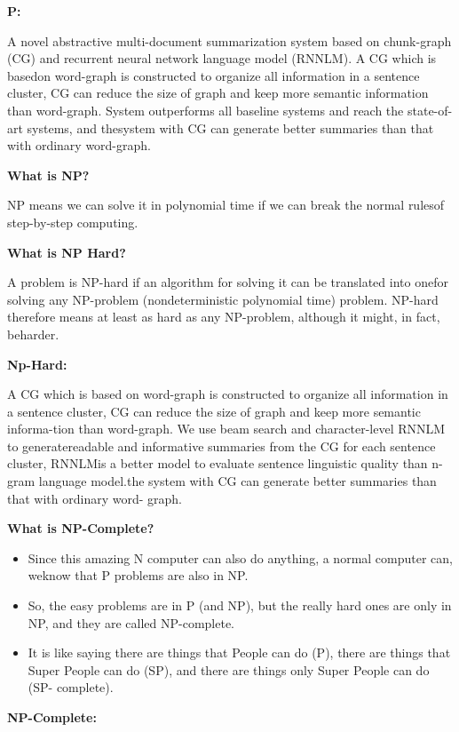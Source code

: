 \documentclass[12pt]{report}
\begin{document}
\textbf{P:}

A novel abstractive multi-document summarization system based on chunk-graph (CG) and
recurrent neural network language model (RNNLM). A CG which is basedon word-graph is 
constructed to organize all information in a sentence cluster, CG can reduce the size of graph 
and keep more semantic information than word-graph. System outperforms all baseline systems 
and reach the state-of-art systems, and thesystem with CG can generate better summaries than
that with ordinary word-graph.



\vspace{1cm}

\textbf{What is NP?
}

NP means we can solve it in polynomial time if we can break the normal rulesof step-by-step
computing.

\textbf{What is NP Hard?}

A problem is NP-hard if an algorithm for solving it can be translated into onefor solving
any NP-problem (nondeterministic polynomial time) problem. NP-hard therefore means at
least as hard as any NP-problem, although it might, in fact, beharder.

\textbf{Np-Hard:
}

A CG which is based on word-graph is constructed to organize all information in a sentence 
cluster, CG can reduce the size of graph and keep more semantic informa-tion than word-graph. 
We use beam search and character-level RNNLM to generatereadable and informative summaries
from the CG for each sentence cluster, RNNLMis a better model to evaluate sentence linguistic
quality than n-gram language model.the system with CG can generate better summaries than that 
with ordinary word- graph.



\vspace{1cm}

\textbf{What is NP-Complete?
}
\begin{itemize}
\item Since this amazing N computer can also do anything, a normal computer can, weknow 
that P problems are also in NP.
\item So, the easy problems are in P (and NP), but the really hard ones are only in
NP, and they are called NP-complete.
\item It is like saying there are things that People can do (P), there are things that Super 
People can do (SP), and there are things only Super People can do (SP- complete).
\end{itemize}
\textbf{NP-Complete:}
\end{document}

